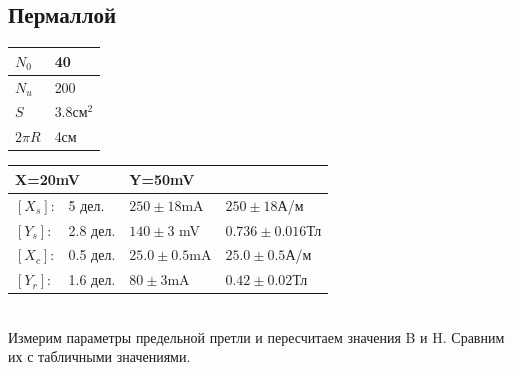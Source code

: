 \documentclass[12pt]{article}
\begin{document}
\subsection{Пермаллой}
\begin{minipage}{0.4\textwidth}
\begin{tabular}{|l|l|}
\hline
$N_0$ & 40        \\ \hline
$N_u$ & 200       \\ \hline
$S$   & 3.8см$^2$ \\ \hline
$2\pi R$ & 4см \\ \hline
\end{tabular}
\end{minipage}
\begin{minipage}{0.5\textwidth}
\begin{tabular}{|l|l|l|l|}
\hline
\multicolumn{2}{|l|}{X=20mV} & \multicolumn{2}{l|}{Y=50mV} \\ \hline
$[X_s]$:    & 5 дел.       & $250 \pm 18 $mA      &    $250 \pm 18$А/м  \\ \hline
$[Y_s]$:    & 2.8 дел.     & $140 \pm 3$ mV       &   $0.736 \pm 0.016$Тл   \\ \hline
$[X_c]$:    & 0.5 дел.     & $25.0 \pm 0.5$mA     &  $25.0 \pm 0.5$А/м    \\ \hline
$[Y_r]$:    & 1.6 дел.     & $80 \pm 3$mA         &  $0.42 \pm 0.02$Тл    \\ \hline
\end{tabular}
\end{minipage}\\

Измерим параметры предельной претли и пересчитаем значения B и H. Сравним их с табличными значениями.\\
\end{document}
